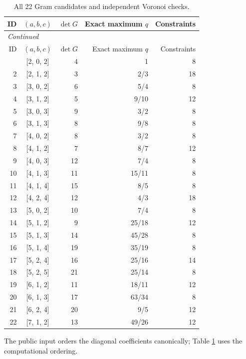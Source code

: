 \documentclass[12pt]{amsart}
\theoremstyle{remark}
\theoremstyle{definition}
\numberwithin{equation}{section}
\begin{document}
\begin{longtable}{rcrrr}
\caption{All 22 Gram candidates and independent Voronoi checks.}\label{tab:grams}\\
\toprule
ID & $(a,b,c)$ & $\det G$ & Exact maximum $q$ & Constraints \\
\midrule
\endfirsthead
\multicolumn{5}{l}{\textit{Continued}}\\
\toprule
ID & $(a,b,c)$ & $\det G$ & Exact maximum $q$ & Constraints \\
\midrule
\endhead
\midrule
\endfoot
\bottomrule
\endlastfoot
1 & [2, 0, 2] & 4 & 1 & 8 \\
2 & [2, 1, 2] & 3 & 2/3 & 18 \\
3 & [3, 0, 2] & 6 & 5/4 & 8 \\
4 & [3, 1, 2] & 5 & 9/10 & 12 \\
5 & [3, 0, 3] & 9 & 3/2 & 8 \\
6 & [3, 1, 3] & 8 & 9/8 & 8 \\
7 & [4, 0, 2] & 8 & 3/2 & 8 \\
8 & [4, 1, 2] & 7 & 8/7 & 12 \\
9 & [4, 0, 3] & 12 & 7/4 & 8 \\
10 & [4, 1, 3] & 11 & 15/11 & 8 \\
11 & [4, 1, 4] & 15 & 8/5 & 8 \\
12 & [4, 2, 4] & 12 & 4/3 & 18 \\
13 & [5, 0, 2] & 10 & 7/4 & 8 \\
14 & [5, 1, 2] & 9 & 25/18 & 12 \\
15 & [5, 1, 3] & 14 & 45/28 & 8 \\
16 & [5, 1, 4] & 19 & 35/19 & 8 \\
17 & [5, 2, 4] & 16 & 25/16 & 14 \\
18 & [5, 2, 5] & 21 & 25/14 & 8 \\
19 & [6, 1, 2] & 11 & 18/11 & 12 \\
20 & [6, 1, 3] & 17 & 63/34 & 8 \\
21 & [6, 2, 4] & 20 & 9/5 & 12 \\
22 & [7, 1, 2] & 13 & 49/26 & 12 \\
\end{longtable}
\endgroup
The public input orders the diagonal coefficients canonically; Table
\ref{tab:grams} uses the computational ordering.

\clearpage
\end{document}
